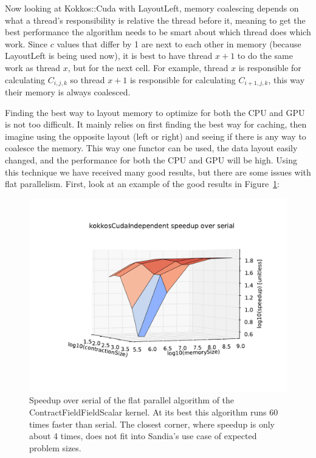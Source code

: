 Now looking at Kokkos::Cuda with LayoutLeft, memory coalescing depends on what a thread's responsibility is relative the thread before it, meaning to get the best performance the algorithm needs to be smart about which thread does which work. Since $c$ values that differ by 1 are next to each other in memory (because LayoutLeft is being used now), it is best to have thread $x+1$ to do the same work as thread $x$, but for the next cell. For example, thread $x$ is responsible for calculating $C_{i, j, k}$ so thread $x+1$ is responsible for calculating $C_{i+1, j, k}$, this way their memory is always coalesced. 

Finding the best way to layout memory to optimize for both the CPU and GPU is not too difficult. It mainly relies on first finding the best way for caching, then imagine using the opposite layout (left or right) and seeing if there is any way to coalesce the memory. This way one functor can be used, the data layout easily changed, and the performance for both the CPU and GPU will be high. Using this technique we have received many good results, but there are some issues with flat parallelism. First, look at an example of the good results in Figure~\ref{lst:ContractFieldFieldScalar speedup over serial}:

\begin{figure}[!ht]
\includegraphics[scale=.8]{CFFS_VersusSerial_kokkosCudaIndependent.pdf}
\caption{Speedup over serial of the flat parallel algorithm of the ContractFieldFieldScalar kernel. At its best this algorithm runs 60 times faster than serial. The closest corner, where speedup is only about 4 times, does not fit into Sandia's use case of expected problem sizes.
\label{lst:ContractFieldFieldScalar speedup over serial}} 
\end{figure}

